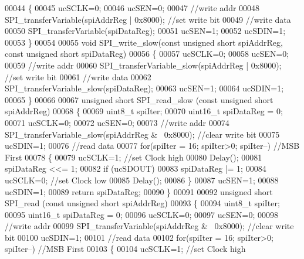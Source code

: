 \begin{DoxyCode}
00044 \{
00045     ucSCLK=0;
00046     ucSEN=0;
00047     \textcolor{comment}{//write addr}
00048     SPI_transferVariable(spiAddrReg | 0x8000); \textcolor{comment}{//set write bit}
00049     \textcolor{comment}{//write data}
00050     SPI_transferVariable(spiDataReg);
00051     ucSEN=1;
00052     ucSDIN=1;
00053 \}
00054 
00055 \textcolor{keywordtype}{void} SPI_write_slow(\textcolor{keyword}{const} \textcolor{keywordtype}{unsigned} \textcolor{keywordtype}{short} spiAddrReg, \textcolor{keyword}{const} \textcolor{keywordtype}{unsigned} \textcolor{keywordtype}{short} spiDataReg)
00056 \{
00057     ucSCLK=0;
00058     ucSEN=0;
00059     \textcolor{comment}{//write addr}
00060     SPI_transferVariable_slow(spiAddrReg | 0x8000); \textcolor{comment}{//set write bit}
00061     \textcolor{comment}{//write data}
00062     SPI_transferVariable_slow(spiDataReg);
00063     ucSEN=1;
00064     ucSDIN=1;
00065 \}
00066 
00067 \textcolor{keywordtype}{unsigned} \textcolor{keywordtype}{short} SPI_read_slow (\textcolor{keyword}{const} \textcolor{keywordtype}{unsigned} \textcolor{keywordtype}{short} spiAddrReg)
00068 \{
00069     uint8\_t spiIter;    
00070     uint16\_t spiDataReg = 0;
00071     ucSCLK=0;
00072     ucSEN=0;
00073     \textcolor{comment}{//write addr}
00074     SPI_transferVariable_slow(spiAddrReg & ~0x8000);    \textcolor{comment}{//clear write bit}
00075     ucSDIN=1;
00076     \textcolor{comment}{//read data}
00077     \textcolor{keywordflow}{for}(spiIter = 16; spiIter>0; spiIter--) \textcolor{comment}{//MSB First}
00078     \{
00079         ucSCLK=1;   \textcolor{comment}{//set Clock high}
00080         Delay();
00081         spiDataReg <<= 1;
00082         \textcolor{keywordflow}{if} (ucSDOUT)
00083             spiDataReg |= 1;
00084         ucSCLK=0;   \textcolor{comment}{//set Clock low}
00085         Delay();
00086     \}
00087     ucSEN=1;
00088     ucSDIN=1;
00089     \textcolor{keywordflow}{return} spiDataReg;
00090 \}
00091 
00092 \textcolor{keywordtype}{unsigned} \textcolor{keywordtype}{short} SPI_read (\textcolor{keyword}{const} \textcolor{keywordtype}{unsigned} \textcolor{keywordtype}{short} spiAddrReg)
00093 \{
00094     uint8\_t spiIter;
00095     uint16\_t spiDataReg = 0;
00096     ucSCLK=0;
00097     ucSEN=0;
00098     \textcolor{comment}{//write addr}
00099     SPI_transferVariable(spiAddrReg & ~0x8000); \textcolor{comment}{//clear write bit}
00100     ucSDIN=1;
00101     \textcolor{comment}{//read data}
00102     \textcolor{keywordflow}{for}(spiIter = 16; spiIter>0; spiIter--) \textcolor{comment}{//MSB First}
00103     \{
00104         ucSCLK=1;   \textcolor{comment}{//set Clock high}

\end{DoxyCode}
